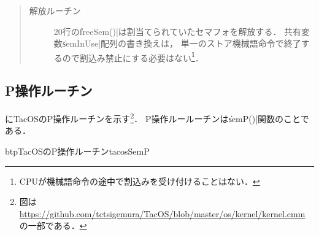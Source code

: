 \begin{quote}
\begin{description}
\item [解放ルーチン]
20行の\|freeSem()|は割当てられていたセマフォを解放する．
共有変数\|semInUse|配列の書き換えは，
単一のストア機械語命令で終了するので割込み禁止にする必要はない\footnote{
CPUが機械語命令の途中で割込みを受け付けることはない．}．
\end{description}
\end{quote}

\subsection{P操作ルーチン}
にTacOSのP操作ルーチンを示す\footnote{図は
\url{https://github.com/tctsigemura/TacOS/blob/master/os/kernel/kernel.cmm}
の一部である．}．
P操作ルールーチンは\|semP()|関数のことである．

\begin{myfig}{btp}{TacOSのP操作ルーチン}{tacosSemP}

\end{myfig}


